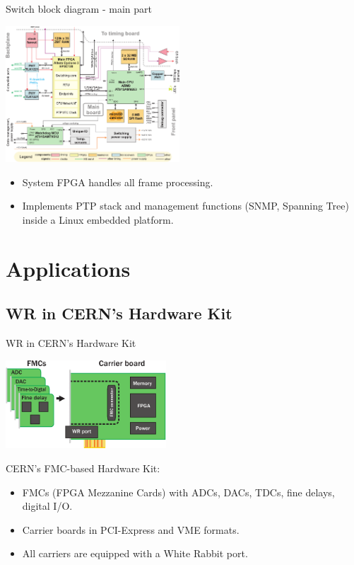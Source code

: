 \documentclass[compress,red]{beamer}
\begin{document}
\begin{frame}{Switch block diagram - main part}
\begin{center}
   \includegraphics[width=6.5cm]{sw_block.pdf}\\
\end{center}
\begin{itemize}
\item System FPGA handles all frame processing.
\item Implements PTP stack and management functions (SNMP, Spanning Tree) 
   inside a Linux embedded platform.
\end{itemize}
\end{frame}

\section{Applications}

\subsection{WR in CERN's Hardware Kit}

\begin{frame}{WR in CERN's Hardware Kit}
\begin{center}

  \includegraphics[width=6cm]{shw_kit.pdf}

  \begin{block}{CERN's FMC-based Hardware Kit:}
    \begin{itemize}
    \item FMCs (FPGA Mezzanine Cards) with ADCs, DACs, TDCs, fine delays, digital I/O.
    \item Carrier boards in PCI-Express and VME formats.
    \item All carriers are equipped with a White Rabbit port.
    \end{itemize}
  \end{block}

\end{center}
\end{frame}
\end{document}
